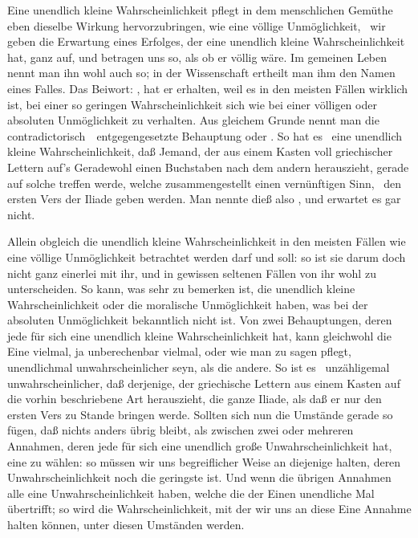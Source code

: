 \begin{aufza}
\item Eine unendlich kleine Wahrscheinlichkeit pflegt in dem menschlichen Gemüthe eben dieselbe Wirkung hervorzubringen, wie eine völlige Unmöglichkeit, \dh\ wir geben die Erwartung eines Erfolges, der eine unendlich kleine Wahrscheinlichkeit hat, ganz auf, und betragen uns so, als ob er völlig  wäre. Im gemeinen Leben nennt man ihn wohl auch so; in der Wissenschaft ertheilt man ihm den Namen eines  Falles. Das Beiwort: , hat er erhalten, weil es in den meisten Fällen wirklich  ist, bei einer so geringen Wahrscheinlichkeit sich wie bei einer völligen oder absoluten Unmöglichkeit zu verhalten. Aus gleichem Grunde nennt man die contradictorisch~\ entgegengesetzte Behauptung  oder . So hat es \zB\ eine unendlich kleine Wahrscheinlichkeit, daß Jemand, der aus einem Kasten voll griechischer Lettern auf's Geradewohl einen Buchstaben nach dem andern herauszieht, gerade auf solche treffen werde, welche zusammengestellt einen vernünftigen Sinn, \zB\ den ersten Vers der Iliade geben werden. Man nennte dieß also , und erwartet es gar nicht.
\item Allein obgleich die unendlich kleine Wahrscheinlichkeit in den meisten Fällen wie eine völlige Unmöglichkeit betrachtet werden darf und soll: so ist sie darum doch nicht ganz einerlei mit ihr, und in gewissen seltenen Fällen von ihr wohl zu unterscheiden. So kann, was sehr zu bemerken ist, die unendlich kleine Wahrscheinlichkeit oder die moralische Unmöglichkeit  haben, was bei der absoluten Unmöglichkeit bekanntlich nicht ist. Von zwei Behauptungen, deren jede für sich eine unendlich kleine Wahrscheinlichkeit hat, kann gleichwohl die Eine vielmal, ja unberechenbar vielmal, oder wie man zu sagen pflegt, unendlichmal unwahrscheinlicher seyn, als die andere. So ist es \zB\ unzähligemal unwahrscheinlicher, daß derjenige, der griechische Lettern aus einem Kasten auf die vorhin beschriebene Art herauszieht, die ganze Iliade, als daß er nur den ersten Vers zu Stande bringen werde. Sollten sich nun die Umstände gerade so fügen, daß nichts anders übrig bleibt, als zwischen zwei oder mehreren Annahmen, deren jede für sich eine unendlich große Unwahrscheinlichkeit hat, eine zu wählen: so müssen wir uns begreiflicher Weise an diejenige halten, deren Unwahrscheinlichkeit noch die geringste ist. Und wenn die übrigen Annahmen alle eine Unwahrscheinlichkeit haben, welche die der Einen unendliche Mal übertrifft; so wird die Wahrscheinlichkeit, mit der wir uns an diese Eine Annahme halten können, unter diesen Umständen  werden.

\end{aufza}
